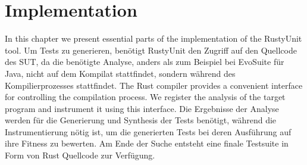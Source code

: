 \documentclass{article}
\begin{document}

\newpage
\section{Implementation}
In this chapter we present essential parts of the implementation of the RustyUnit tool. Um Tests zu generieren, benötigt RustyUnit den Zugriff auf den Quellcode des SUT, da die benötigte Analyse, anders als zum Beispiel bei EvoSuite für Java, nicht auf dem Kompilat stattfindet, sondern während des Kompilierprozesses stattfindet. The Rust compiler provides a convenient interface for controlling the compilation process. We register the analysis of the target program and instrument it using this interface. Die Ergebnisse der Analyse werden für die Generierung und Synthesis der Tests benötigt, während die Instrumentierung nötig ist, um die generierten Tests bei deren Ausführung auf ihre Fitness zu bewerten. Am Ende der Suche entsteht eine finale Testsuite in Form von Rust Quellcode zur Verfügung.
\end{document}
